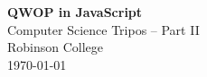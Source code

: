\documentclass[12pt,a4paper,twoside,openright]{report}
\begin{document}


\pagestyle{empty}


\vspace*{60mm}
\begin{center}
\Huge
\textbf{QWOP in JavaScript} \\[5mm]
Computer Science Tripos -- Part II \\[5mm]
Robinson College \\[5mm]
\today  %
\end{center}









\end{document}
